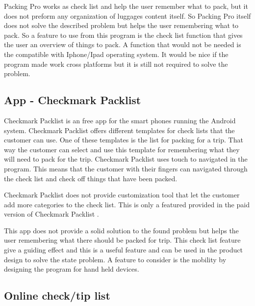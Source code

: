 Packing Pro works as check list and help the user remember what to pack, but it does not preform any organization of luggages content itself. So Packing Pro itself does not solve the described problem but helps the user remembering what to pack. So a feature to use from this program is the check list function that gives the user an overview of things to pack.
A function that would not be needed is the compatible with Iphone/Ipad operating system. It would be nice if the program made work cross platforms but it is still not required to solve the problem.

\subsection*{App - Checkmark Packlist}

Checkmark Packlist is an free app for the smart phones running the Android system.
Checkmark Packlist offers different templates for check lists that the customer can use. One of these templates is the list for packing for a trip. That way the customer can select and use this template for remembering what they will need to pack for the trip. Checkmark Packlist uses touch to navigated in the program. This means that the customer with their fingers can navigated through the check list and check off things that have been packed.


Checkmark Packlist does not provide customization tool that let the customer add more categories to the check list. This is only a featured provided in the paid version of Checkmark Packlist \citep{checkpacklist}.

This app does not provide a solid solution to the found problem but helps the user remembering what there should be packed for trip. This check list feature give a guiding effect and this is a useful feature and can be used in the product design to solve the state problem. A feature to consider is the mobility by designing the program for hand held devices.

\subsection*{Online check/tip list}


